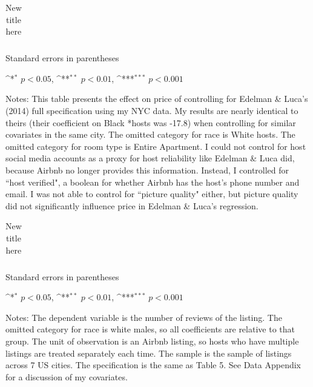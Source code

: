\begin{table}[htbp]\centering
	\def\sym#1{\ifmmode^{#1}\else\(^{#1}\)\fi}
	\caption{New title here}
	\label{table:edelman_new}
	\begin{tabular}{c|c}
		\toprule
		
		
		
		\bottomrule
	\end{tabular}
	
	\begin{tablenotes}
		\item \footnotesize Standard errors in parentheses
		\item \footnotesize \sym{*} \(p<0.05\), \sym{**} \(p<0.01\), \sym{***} \(p<0.001\)
		
		\item Notes: This table presents the effect on price of controlling for Edelman \& Luca's (2014) full specification using my NYC data. My results are nearly identical to theirs (their coefficient on Black *hosts was -17.8) when controlling for similar covariates in the same city. The omitted category for race is White hosts. The omitted category for room type is Entire Apartment. I could not control for host social media accounts as a proxy for host reliability like Edelman \& Luca did, because Airbnb no longer provides this information. Instead, I controlled for ``host verified", a boolean for whether Airbnb has the host's phone number and email. I was not able to control for ``picture quality" either, but picture quality did not significantly influence price in Edelman \& Luca's regression.
	\end{tablenotes}
\end{table}




\begin{table}[htbp]\centering
	\def\sym#1{\ifmmode^{#1}\else\(^{#1}\)\fi}
	\caption{New title here}
	\label{table:numreviews_new}
	\begin{tabular}{c|ccccc}
		\toprule
		
		
		
		\bottomrule
	\end{tabular}
	
	\begin{tablenotes}
		\item \footnotesize Standard errors in parentheses
		\item \footnotesize \sym{*} \(p<0.05\), \sym{**} \(p<0.01\), \sym{***} \(p<0.001\)
		
		\item Notes: The dependent variable is the number of reviews of the listing. The omitted category for race is white males, so all coefficients are relative to that group. The unit of observation is an Airbnb listing, so hosts who have multiple listings are treated separately each time. The sample is the sample of listings across 7 US cities. The specification is the same as Table 5. See Data Appendix for a discussion of my covariates.	\end{tablenotes}
\end{table}

